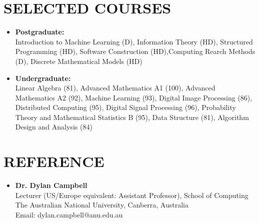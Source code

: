 \documentclass[11pt,a4paper,roman]{moderncv}        %
\begin{document}
	\section{SELECTED COURSES}
	
	\begin{itemize}
		\item \textbf{Postgraduate:} \vspace*{0.75mm} \\
		Introduction to Machine Learning (D), Information Theory (HD), Structured Programming (HD), Software Construction (HD),Computing Rearch Methods (D), Discrete Mathematical Models (HD)
		\vspace*{1.75mm}
		\item \textbf{Undergraduate:} \vspace*{0.75mm} \\
		Linear Algebra (81), Advanced Mathematics A1 (100), Advanced Mathematics A2 (92), Machine Learning (93), Digital Image Processing (86), Distributed Computing (95), Digital Signal Processing (96), Probability Theory and Mathematical Statistics B (95), Data Structure (81),  Algorithm Design and Analysis (84)
 	\end{itemize}

    \section{REFERENCE}
	
	\vspace*{-3.5mm}
	
	\begin{itemize}
            \vspace*{2.5mm}
			\item \textbf{Dr. Dylan Campbell}\\
			Lecturer (US/Europe equivalent: Assistant Professor), School of Computing\\
			The Australian National University, Canberra, Australia \\
			Email: dylan.campbell@anu.edu.au
	\end{itemize}


	

	\cfoot{\vspace{-2mm}{\color{gray} \rule[-10pt]{14.3cm}{0.05em}} \vspace{2mm}\\ \emph{\textcolor{gray}{Last Updated by: 2025/10/01}}}
	
	
\end{document}
